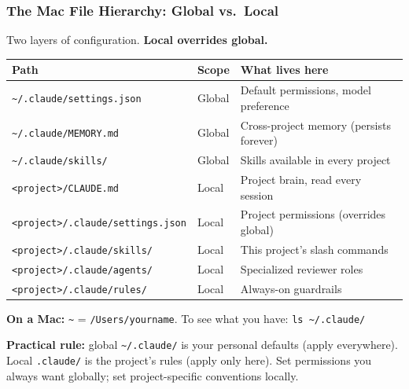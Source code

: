 \documentclass[10pt,english,aspectratio=169]{beamer}
\begin{document}
\begin{frame}
\frametitle{The Mac File Hierarchy: Global vs.\ Local}

Two layers of configuration. \textbf{Local overrides global.}

\vspace{0.2cm}

\begin{center}
\footnotesize
\begin{tabular}{|l|l|p{5.5cm}|}
\hline
\textbf{Path} & \textbf{Scope} & \textbf{What lives here} \\ \hline
\texttt{\textasciitilde/.claude/settings.json} & Global & Default permissions, model preference \\ \hline
\texttt{\textasciitilde/.claude/MEMORY.md} & Global & Cross-project memory (persists forever) \\ \hline
\texttt{\textasciitilde/.claude/skills/} & Global & Skills available in every project \\ \hline
\hline
\texttt{<project>/CLAUDE.md} & Local & Project brain, read every session \\ \hline
\texttt{<project>/.claude/settings.json} & Local & Project permissions (overrides global) \\ \hline
\texttt{<project>/.claude/skills/} & Local & This project's slash commands \\ \hline
\texttt{<project>/.claude/agents/} & Local & Specialized reviewer roles \\ \hline
\texttt{<project>/.claude/rules/} & Local & Always-on guardrails \\ \hline
\end{tabular}
\end{center}

\vspace{0.2cm}

\textbf{On a Mac:} \texttt{\textasciitilde} = \texttt{/Users/yourname}. To see what you have: \texttt{ls \textasciitilde/.claude/}

\vspace{0.1cm}

\textbf{Practical rule:} global \texttt{\textasciitilde/.claude/} is your personal defaults (apply everywhere). Local \texttt{.claude/} is the project's rules (apply only here). Set permissions you always want globally; set project-specific conventions locally.
\end{frame}
\end{document}
